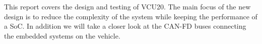 This report covers the design and testing of VCU20. The main focus of the new design is to reduce the complexity of the system while keeping the performance of a SoC. In addition we will take a closer look at the CAN-FD buses connecting the embedded systems on the vehicle.











